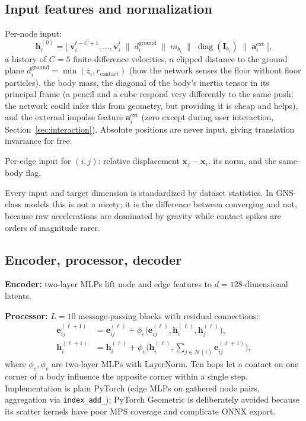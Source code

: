 \documentclass[11pt]{article}
\newcommand{\x}{\mathbf{x}}
\newcommand{\vv}{\mathbf{v}}
\begin{document}
\subsection{Input features and normalization}
Per-node input:
\begin{equation}
\mathbf{h}_i^{(0)} = \big[\; \vv_i^{t-C+1}, \ldots, \vv_i^{t} \;\big\|\; d_i^{\text{ground}} \;\big\|\; m_{b_i} \;\big\|\; \operatorname{diag}(\mathbf{I}_{b_i}) \;\big\|\; \mathbf{a}_i^{\text{ext}} \;\big],
\end{equation}
a history of $C=5$ finite-difference velocities, a clipped distance to the ground plane $d_i^{\text{ground}} = \min(z_i, r_{\text{contact}})$ (how the network senses the floor without floor particles), the body mass, the diagonal of the body's inertia tensor in its principal frame (a pencil and a cube respond very differently to the same push; the network could infer this from geometry, but providing it is cheap and helps), and the external impulse feature $\mathbf{a}_i^{\text{ext}}$ (zero except during user interaction, Section~\ref{sec:interaction}). Absolute positions are never input, giving translation invariance for free.

Per-edge input for $(i,j)$: relative displacement $\x_j - \x_i$, its norm, and the same-body flag.

Every input and target dimension is standardized by dataset statistics. In GNS-class models this is not a nicety; it is the difference between converging and not, because raw accelerations are dominated by gravity while contact spikes are orders of magnitude rarer.

\subsection{Encoder, processor, decoder}
\textbf{Encoder:} two-layer MLPs lift node and edge features to $d=128$-dimensional latents.

\textbf{Processor:} $L=10$ message-passing blocks with residual connections:
\begin{align}
\mathbf{e}_{ij}^{(\ell+1)} &= \mathbf{e}_{ij}^{(\ell)} + \phi_e\!\big(\mathbf{e}_{ij}^{(\ell)}, \mathbf{h}_i^{(\ell)}, \mathbf{h}_j^{(\ell)}\big), \\
\mathbf{h}_i^{(\ell+1)} &= \mathbf{h}_i^{(\ell)} + \phi_v\!\Big(\mathbf{h}_i^{(\ell)}, \textstyle\sum_{j \in \mathcal{N}(i)} \mathbf{e}_{ij}^{(\ell+1)}\Big),
\end{align}
where $\phi_e, \phi_v$ are two-layer MLPs with LayerNorm. Ten hops let a contact on one corner of a body influence the opposite corner within a single step. Implementation is plain PyTorch (edge MLPs on gathered node pairs, aggregation via \texttt{index\_add\_}); PyTorch Geometric is deliberately avoided because its scatter kernels have poor MPS coverage and complicate ONNX export.
\end{document}
